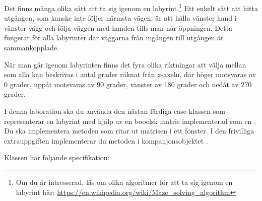Det finns många olika sätt att ta sig igenom en labyrint.\footnote{Om du är intresserad, läs om olika algoritmer för att ta sig igenom en labyrint här: \url{https://en.wikipedia.org/wiki/Maze\_solving\_algorithm}} Ett enkelt sätt att hitta utgången, som kanske inte följer närmsta vägen, är att hålla vänster hand i vänster vägg och följa väggen med handen tills man når öppningen. Detta fungerar för alla labyrinter där väggarna från ingången till utgången är sammankopplade.

När man går igenom labyrinten finns det fyra olika riktningar att välja mellan som alla kan beskrivas i antal grader räknat från x-axeln, där höger motsvaras av 0 grader, uppåt motsvaras av 90 grader, vänster av 180 grader och nedåt av 270 grader.

I denna laboration ska du använda den nästan färdiga case-klassen  som representerar en labyrint med hjälp av en booelsk matris implementerad som en \code{Vector[Vector[Boolean]}. Du ska implementera metoden  som ritar ut matrisen i ett fönster. I den frivilliga extrauppgiften implementerar du metoden  i kompanjonsobjektet .


Klassen  har följande specifikation:

